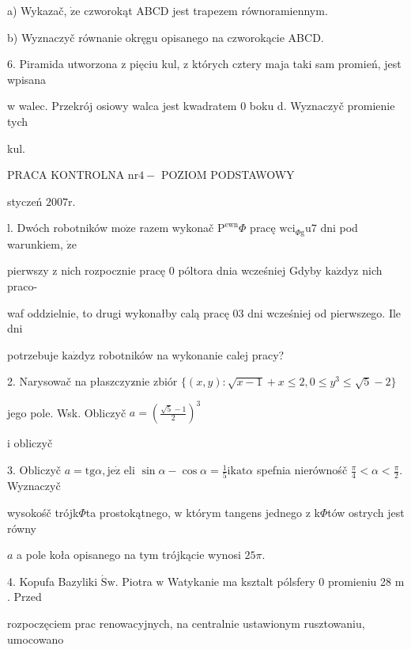 \documentclass[a4paper,12pt]{article}
\begin{document}
a) Wykazač, $\dot{\mathrm{z}}\mathrm{e}$ czworokąt ABCD jest trapezem równoramiennym.

b) Wyznaczyč równanie okręgu opisanego na czworokącie ABCD.

6. Piramida utworzona z pięciu kul, z których cztery maja taki sam promień, jest wpisana

w walec. Przekrój osiowy walca jest kwadratem 0 boku d. Wyznaczyč promienie tych

kul.





PRACA KONTROLNA $\mathrm{n}\mathrm{r}4-$ POZIOM PODSTAWOWY

styczeń $2007\mathrm{r}.$

l. Dwóch robotników $\mathrm{m}\mathrm{o}\dot{\mathrm{z}}\mathrm{e}$ razem wykonač $\mathrm{P}^{\mathrm{e}\mathrm{w}\mathrm{n}}\Phi$ pracę $\mathrm{w}\mathrm{c}\mathrm{i}_{\Phi \mathrm{g}}\mathrm{u}7$ dni pod warunkiem, $\dot{\mathrm{z}}\mathrm{e}$

pierwszy $\mathrm{z}$ nich rozpocznie pracę $0$ póltora dnia wcześniej Gdyby $\mathrm{k}\mathrm{a}\dot{\mathrm{z}}\mathrm{d}\mathrm{y}\mathrm{z}$ nich praco-

waf oddzielnie, to drugi wykonałby calą pracę $03$ dni wcześniej od pierwszego. Ile dni

potrzebuje $\mathrm{k}\mathrm{a}\dot{\mathrm{z}}\mathrm{d}\mathrm{y}\mathrm{z}$ robotników na wykonanie calej pracy?

2. Narysowač na płaszczyz$\acute{}$nie zbiór $\{(x,y):\sqrt{x-1}+x\leq 2,0\leq y^{3}\leq\sqrt{5}-2\}$

jego pole. Wsk. Obliczyč $a=(\displaystyle \frac{\sqrt{5}-1}{2})^{3}$

i obliczyč

3. Obliczyč $a=\mathrm{t}\mathrm{g}\alpha, \mathrm{j}\mathrm{e}\dot{\mathrm{z}}$ eli $\displaystyle \sin\alpha-\cos\alpha=\frac{1}{5}\mathrm{i}\mathrm{k}\mathrm{a}\mathrm{t}\alpha$ spefnia nierównośč $\displaystyle \frac{\pi}{4}<\alpha<\frac{\pi}{2}$. Wyznaczyč

wysokośč trójk$\Phi$ta prostokątnego, $\mathrm{w}$ którym tangens jednego $\mathrm{z}$ k$\Phi$tów ostrych jest równy

$a$ a pole koła opisanego na tym trójkącie wynosi $25\pi.$

4. Kopufa Bazyliki $\acute{\mathrm{S}}\mathrm{w}$. Piotra $\mathrm{w}$ Watykanie ma ksztalt pólsfery $0$ promieniu 28 $\mathrm{m}$. Przed

rozpoczęciem prac renowacyjnych, na centralnie ustawionym rusztowaniu, umocowano
\end{document}
